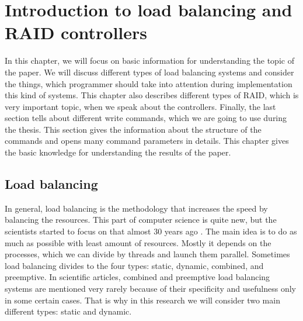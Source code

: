 \chapter{Introduction to load balancing and RAID controllers}
\label{chap2:title}

In this chapter, we will focus on basic information for understanding the topic of the paper. We will discuss different types of load balancing systems and consider the things, which programmer should take into attention during implementation this kind of systems. This chapter also describes different types of RAID, which is very important topic, when we speak about the controllers. Finally, the last section tells about different write commands, which we are going to use during the thesis. This section gives the information about the structure of the commands and opens many command parameters in details. This chapter gives the basic knowledge for understanding the results of the paper.

\newpage
\section{Load balancing}
In general, load balancing is the methodology that increases the speed by balancing the resources. This part of computer science is quite new, but the scientists started to focus on that almost 30 years ago \cite{stat_load_bal_1985}. The main idea is to do as much as possible with least amount of resources. Mostly it depends on the processes, which we can divide by threads and launch them parallel. Sometimes load balancing divides to the four types: static, dynamic, combined, and preemptive. In scientific articles, combined and preemptive load balancing systems are mentioned very rarely because of their specificity and usefulness only in some certain cases. That is why in this research we will consider two main different types: static and dynamic.

